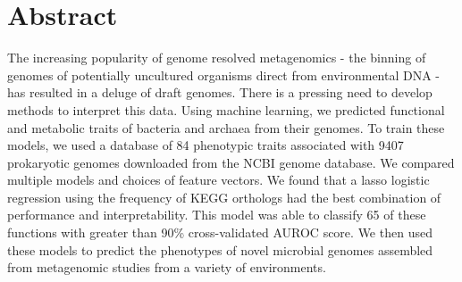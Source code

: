 \documentclass[10pt,letterpaper]{article}
\begin{document}
\section*{Abstract}
The increasing popularity of genome resolved metagenomics - the binning of 
genomes of potentially uncultured organisms direct from environmental DNA - has resulted 
in a deluge of draft genomes. There is a pressing need to develop methods to interpret this data. Using machine learning, we predicted functional and metabolic traits of bacteria and archaea from their genomes. To train these models, we used a database of 84 phenotypic traits associated with 9407 prokaryotic genomes downloaded from the NCBI genome database. We compared multiple models and choices of feature vectors. We found that a lasso logistic regression using the frequency of KEGG orthologs had the best combination 
of performance and interpretability. This model was able to classify 65 of these functions with greater than 90\% cross-validated AUROC score. We then used these models to predict the phenotypes of novel microbial genomes assembled from metagenomic studies from a variety of environments.


\linenumbers

\end{document}
